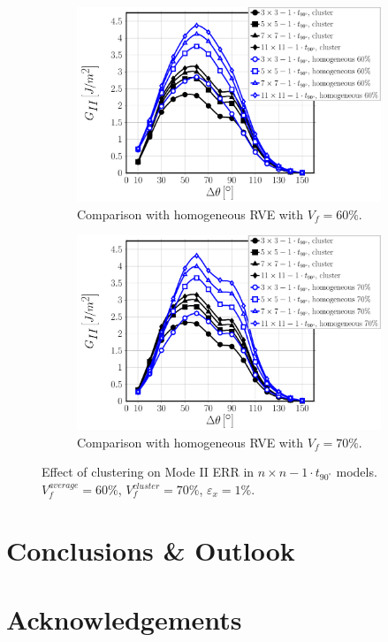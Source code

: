 \documentclass[review]{elsarticle}
\begin{document}
\begin{figure}[!h]
\centering
    \begin{subfigure}[b]{0.475\textwidth}
        \includegraphics[width=\textwidth]{nxn-1t90-vf60-GII.pdf}
        \caption{Comparison with homogeneous RVE with $V_{f}=60\%$.}\label{subfig:cluster1t90nxnModeII60}
    \end{subfigure}\quad
    \begin{subfigure}[b]{0.475\textwidth}
        \includegraphics[width=\textwidth]{nxn-1t90-vf70-GII.pdf}
        \caption{Comparison with homogeneous RVE with $V_{f}=70\%$.}\label{subfig:cluster1t90nxnModeII70}
    \end{subfigure}

\caption{Effect of clustering on Mode II ERR in $n\times n-1\cdot t_{90^{\circ}}$ models. $V^{average}_{f}=60\%$, $V^{cluster}_{f}=70\%$, $\varepsilon_{x}=1\%$.}\label{fig:cluster1t90nxnModeII}
\end{figure}


\section{Conclusions \& Outlook}




\section*{Acknowledgements}




\end{document}
